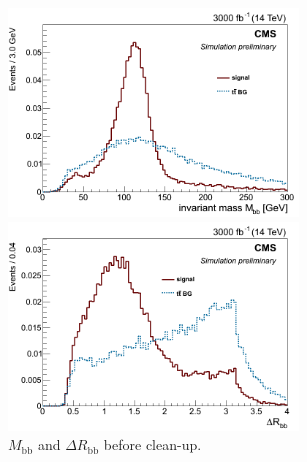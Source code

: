 \documentclass[10pt,a4paper]{article}
\newcommand{\ww}{7.7cm} %
\newcommand{\dd}{-2mm} %
\begin{document}
\begin{figure}[h]
    \begin{minipage}[h!]{\ww}
      \centering
      \includegraphics[width=\ww]{figs/M_bb_closest_stage1.png}
    \end{minipage}
    \begin{minipage}[h!]{\ww}
      \centering
      \includegraphics[width=\ww]{figs/DeltaR_bb1_stage1.png}
    \end{minipage}
  \vspace{\dd}
  \caption{$M_\text{bb}$ and $\Delta R_\text{bb}$ before clean-up.} \label{multi}
\end{figure}
\end{document}

